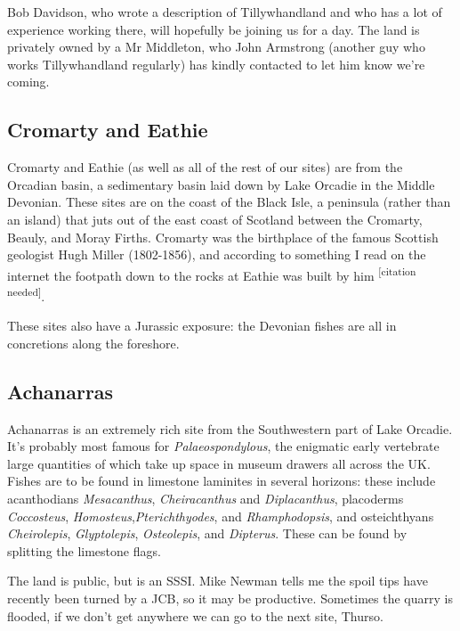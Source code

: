\documentclass[12pt,letterpaper]{article}
\begin{document}
Bob Davidson, who wrote a description of Tillywhandland and who has a lot of experience working there, will hopefully be joining us for a day.  The land is privately owned by a Mr Middleton, who John Armstrong (another guy who works Tillywhandland regularly) has kindly contacted to let him know we're coming.\newline


\subsection{Cromarty and Eathie}

Cromarty and Eathie (as well as all of the rest of our sites) are from the Orcadian basin, a sedimentary basin laid down by Lake Orcadie in the Middle Devonian.  These sites are on the coast of the Black Isle, a peninsula (rather than an island) that juts out of the east coast of Scotland between the Cromarty, Beauly, and Moray Firths.  Cromarty was the birthplace of the famous Scottish geologist Hugh Miller (1802-1856), and according to something I read on the internet the footpath down to the rocks at Eathie was built by him \textsuperscript{[citation needed]}.  

These sites also have a Jurassic exposure: the Devonian fishes are all in concretions along the foreshore.

\subsection{Achanarras}

Achanarras is an extremely rich site from the Southwestern part of Lake Orcadie.  It's probably most famous for \textit{Palaeospondylous}, the enigmatic early vertebrate large quantities of which take up space in museum drawers all across the UK.  Fishes are to be found in limestone laminites in several horizons: these include acanthodians \textit{Mesacanthus}, \textit{Cheiracanthus} and \textit{Diplacanthus}, placoderms \textit{Coccosteus}, \textit{Homosteus},\textit{Pterichthyodes}, and \textit{Rhamphodopsis}, and osteichthyans \textit{Cheirolepis}, \textit{Glyptolepis}, \textit{Osteolepis}, and \textit{Dipterus}.  These can be found by splitting the limestone flags.

The land is public, but is an SSSI.  Mike Newman tells me the spoil tips have recently been turned by a JCB, so it may be productive. Sometimes the quarry is flooded, if we don't get anywhere we can go to the next site, Thurso.
\end{document}
